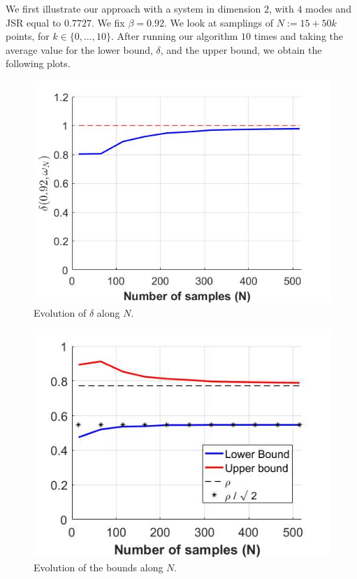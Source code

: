 We first illustrate our approach with a system in dimension $2$, with $4$ modes and JSR equal to $0.7727$. We fix $\beta = 0.92$. We look at samplings of $N:=15+50k$ points, for $k \in \{0, \dots,10\}$. After running our algorithm $10$ times and taking the average value for the lower bound, $\delta$, and the upper bound, we obtain the following plots.


\begin{figure}

\begin{center}
\includegraphics[scale=0.35]{delta1.jpg}
\caption{Evolution of $\delta$ along $N$.}
\end{center}
\end{figure}


\begin{figure}
\begin{center}
\includegraphics[scale=0.35]{bounds1.jpg}
\caption{Evolution of the bounds along $N$.}
\end{center}
\end{figure}

